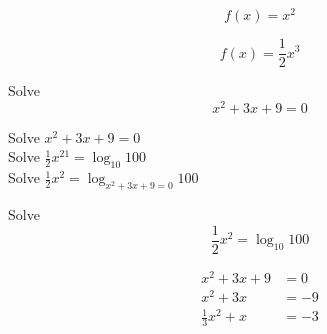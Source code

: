 \documentclass{article}
\begin{document}
\begin{equation}
f(x) = x^2
\end{equation}

\begin{equation}
    f(x)=\frac{1}{2}x^3
\end{equation}

Solve $$x^2+3x+9=0$$ 

Solve \(x^2+3x+9=0\) \\
Solve \(\frac{1}{2}x^{21}=\log_{10}100\) \\
Solve \(\displaystyle \frac{1}{2}x^2=\log_{x^2+3x+9=0}100\)

Solve \[\frac{1}{2}x^2=\log_{10}100\]

\begin{align}
    x^2+3x+9&=0\\ 
    x^2+3x&=-9 \nonumber \\
    \frac{1}{3}x^2+x&=-3
\end{align}
\end{document}
